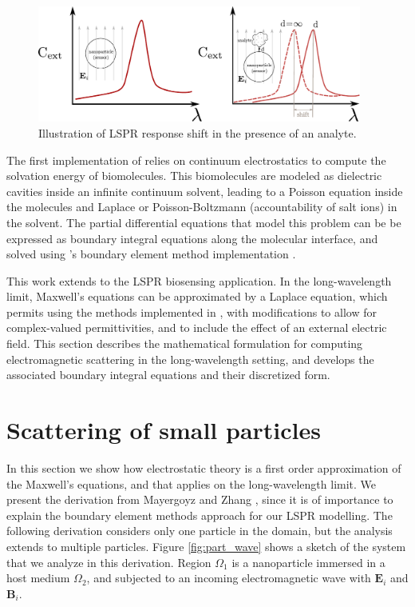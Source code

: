 \begin{figure}
   \centering
     \includegraphics[width=0.95\textwidth]{lspr_biosensing.pdf} 
     \caption{Illustration of LSPR response shift in the presence of an analyte.}
     \label{fig:lspr_bio}
\end{figure}


The first implementation of \pygbe relies on continuum electrostatics to compute the solvation energy
of biomolecules. This biomolecules are modeled as dielectric cavities inside an infinite continuum 
solvent, leading to a Poisson equation inside the molecules and Laplace or Poisson-Boltzmann
(accountability  of salt ions) in the solvent. The partial differential equations that model this problem
can be be expressed as boundary integral equations along the molecular interface, and solved using 
\pygbe's boundary element method implementation \cite{CooperBardhanBarba2013,CooperClementiBarba2015}.

This work extends \pygbe to the LSPR biosensing application. In the long-wavelength limit,
Maxwell's equations can be approximated by a Laplace equation, which permits using the methods implemented in \pygbe, with modifications
to allow for complex-valued permittivities, and to include the effect of an external electric field. This section describes the mathematical formulation for computing electromagnetic scattering 
in the long-wavelength setting, and develops the associated boundary integral equations and their discretized form.

\section{Scattering of small particles} \label{sec:scattering_small}

In this section we show how electrostatic theory is a first order approximation of the Maxwell's 
equations, and that applies on the long-wavelength limit. We present the derivation from 
Mayergoyz and Zhang \cite{MayergoyzZhang2007}, since it is of importance to explain the boundary 
element methods approach for our LSPR modelling. The following derivation considers only one particle 
in the domain, but the analysis extends to multiple particles. Figure \ref{fig:part_wave} shows a 
sketch of the system that we analyze in this derivation. Region $\Omega_1$ is a nanoparticle 
immersed in a host medium $\Omega_2$, and subjected to an incoming electromagnetic wave with
$\mathbf{E}_i$ and $\mathbf{B}_i$.

